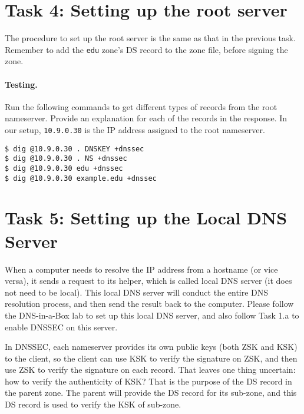 \section{Task 4: Setting up the root server} 

The procedure to set up the root server is the same as that in the 
previous task. Remember to add the \texttt{edu} zone's DS record 
to the zone file, before signing the zone.  


\paragraph{Testing.}
Run the following commands to get different types of records
from the root nameserver. Provide an explanation
for each of the records in the response. In our setup,
\texttt{10.9.0.30} is the 
IP address assigned to the root nameserver.


\begin{lstlisting}
$ dig @10.9.0.30 . DNSKEY +dnssec
$ dig @10.9.0.30 . NS +dnssec
$ dig @10.9.0.30 edu +dnssec
$ dig @10.9.0.30 example.edu +dnssec
\end{lstlisting}




\section{Task 5: Setting up the Local DNS Server} 


When a computer needs to resolve the IP address from a hostname (or vice versa),
it sends a request to its helper, which is called local DNS server (it
does not need to be local).  This local DNS server will conduct the
entire DNS resolution process, and then send the result back to the computer.
Please follow the DNS-in-a-Box lab to set up this local DNS server, and also
follow Task 1.a to enable DNSSEC on this server. 

In DNSSEC, each nameserver provides its own public keys (both ZSK and KSK) to
the client, so the client can use KSK to verify the signature on ZSK, and then use ZSK to 
verify the signature on each record. That leaves one thing uncertain: how to verify
the authenticity of KSK? That is the purpose of the DS record in the parent zone. 
The parent will provide the DS record for its sub-zone, and this DS record is used 
to verify the KSK of sub-zone. 

